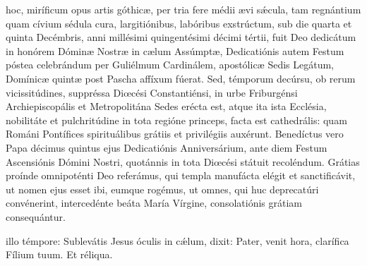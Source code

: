 \documentclass[fontsize=9pt,paper=A6,twoside,BCOR=1mm,DIV=22,headinclude]{scrarticle}
\begin{document}
\pagebreak

\begin{multicols}{2}


 hoc, miríficum opus artis góthicæ, per tria fere médii ævi s\'æcula, tam regnántium quam cívium sédula cura, largitiónibus, labóribus exstrúctum, sub die quarta et quinta Decémbris, anni millésimi quingentésimi décimi tértii, fuit Deo dedicátum in honórem Dóminæ Nostræ in cælum Assúmptæ, Dedicatiónis autem Festum póstea celebrándum per Guliélmum Cardinálem, apostólicæ Sedis Legátum, Domínicæ quintæ post Pascha affíxum fúerat. Sed, témporum decúrsu, ob rerum vicissitúdines, suppréssa Diœcési Constantiénsi, in urbe Friburgénsi Archiepiscopális et Metropolitána Sedes erécta est, atque ita ista Ecclésia, nobilitáte et pulchritúdine in tota regióne princeps, facta est cathedrális: quam Románi Pontífices spirituálibus grátiis et privilégiis auxérunt. Benedíctus vero Papa décimus quintus ejus Dedicatiónis Anniversárium, ante diem Festum Ascensiónis Dómini Nostri, quotánnis in tota Diœcési státuit recoléndum. Grátias proínde omnipoténti Deo referámus, qui templa manufácta elégit et sanctificávit, ut nomen ejus esset ibi, eumque rogémus, ut omnes, qui huc deprecatúri convénerint, intercedénte beáta María Vírgine, consolatiónis grátiam consequántur.



{

 illo témpore: 
Sublevátis Jesus óculis in c\'ælum, dixit:
Pater, venit hora, clarífica Fílium tuum.
Et réliqua.

}
\end{multicols}
\end{document}
